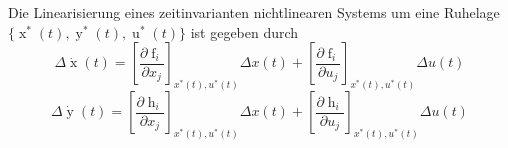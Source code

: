Die Linearisierung eines zeitinvarianten nichtlinearen Systems um eine Ruhelage $\{\operatorname{x}^*(t), \operatorname{y}^*(t), \operatorname{u}^*(t)\}$ ist gegeben durch
$$\Delta \dot{\operatorname{x}}(t) = \left[ \frac{\partial \operatorname{f}_i}{\partial x_j} \right]_{x^*(t), u^*(t)} \Delta x(t) + \left[ \frac{\partial \operatorname{f}_i}{\partial u_j} \right]_{x^*(t), u^*(t)} \Delta u(t)$$
$$\Delta\dot{\operatorname{y}}(t) = \left[ \frac{\partial \operatorname{h}_i}{\partial x_j} \right]_{x^*(t), u^*(t)} \Delta x(t) + \left[ \frac{\partial \operatorname{h}_i}{\partial u_j} \right]_{x^*(t), u^*(t)} \Delta u(t)$$
